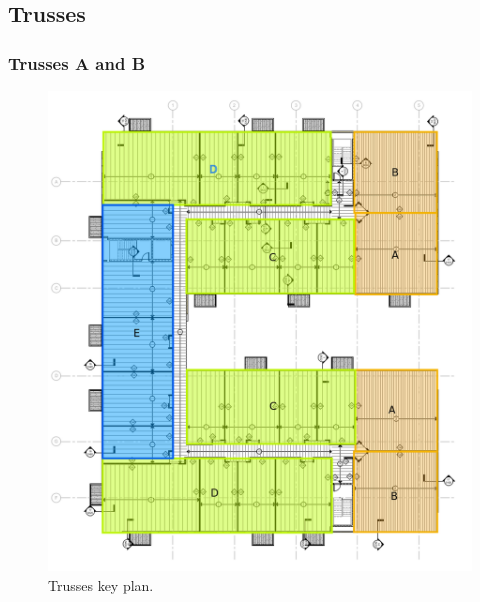 \subsection{Trusses}

\subsubsection{Trusses A and B}

\begin{figure}
  \begin{center}
  \includegraphics[width=120mm]{figures/3rd_floor_truss_key_plan}
  \end{center}
  \caption{Trusses key plan.}\label{fg_3rd_floor_truss_key_plan}
\end{figure}
